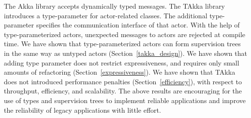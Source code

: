 The Akka library accepts dynamically typed messages.  The TAkka
library introduces a type-parameter for actor-related classes. The additional 
type-parameter specifies the communication interface of 
that actor.  With the help of type-parameterized actors, unexpected 
messages to actors are rejected at compile time.
We have shown that type-parameterized 
actors can form supervision trees in the same way as untyped actors (Section~\ref{takka_design}).
We have shown that
adding type parameter does not restrict expressiveness, and requires
only small amounts of refactoring (Section~\ref{expressiveness}).  We have
shown that TAkka does not introduced performance penalties (Section~\ref{efficiency}), 
with respect to throughput, efficiency, and scalability.  The above results are encouraging for the 
use of types and supervision trees to implement reliable applications and improve the 
reliability of legacy applications with little effort.  
